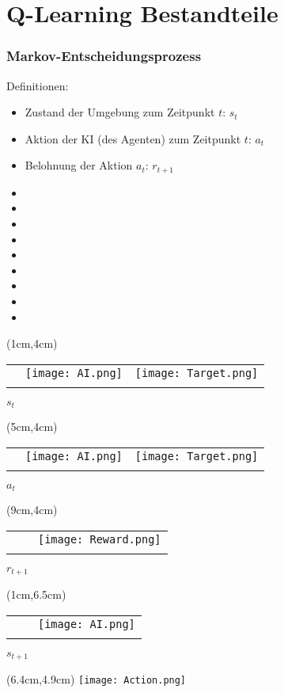 \documentclass{beamer}
\begin{document}
\section{Q-Learning Bestandteile}

\begin{frame}%
\frametitle{Markov-Entscheidungsprozess}
Definitionen:
\begin{itemize}
\item Zustand der Umgebung zum Zeitpunkt $t$: $s_t$
\item Aktion der KI (des Agenten) zum Zeitpunkt $t$: $a_t$ 
\item Belohnung der Aktion $a_t$: $r_{t+1}$ 
\item[]
\item[]
\item[]
\item[]
\item[]
\item[]
\item[]
\item[]
\item[]
\end{itemize}

\begin{textblock*}{2cm}(1cm,4cm)
\begin{tabular}{c|p{1cm}|p{1cm}}
&&\\
\hline
& \texttt{[image: AI.png]} & \texttt{[image: Target.png]}\\
\hline
&&
\end{tabular}
$s_t$
\end{textblock*}

\begin{textblock*}{2cm}(5cm,4cm)
\begin{tabular}{c|p{1cm}|p{1cm}}
&&\\
\hline
& \texttt{[image: AI.png]} & \texttt{[image: Target.png]}\\
\hline
&&
\end{tabular}
$a_t$
\end{textblock*}

\begin{textblock*}{2cm}(9cm,4cm)
\begin{tabular}{c|p{1cm}|p{1cm}}
&&\\
\hline
&& \texttt{[image: Reward.png]}\\
\hline
&&
\end{tabular}
$r_{t+1}$
\end{textblock*}

\begin{textblock*}{2cm}(1cm,6.5cm)
\begin{tabular}{c|p{1cm}|p{1cm}}
&&\\
\hline
&& \texttt{[image: AI.png]}\\
\hline
&&
\end{tabular}
$s_{t+1}$
\end{textblock*}

\begin{textblock*}{2cm}(6.4cm,4.9cm)
\texttt{[image: Action.png]}
\end{textblock*}
\end{frame}
\end{document}
